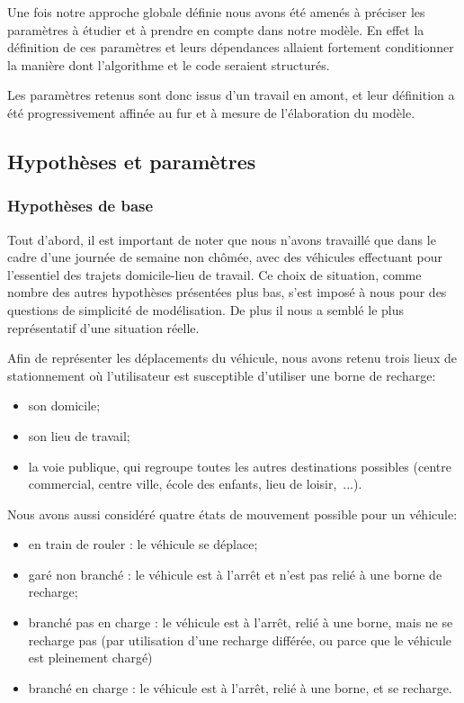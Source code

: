 		Une fois notre approche globale définie nous avons été amenés à préciser les paramètres à étudier et à prendre en compte dans notre modèle. En effet la définition de ces paramètres et leurs dépendances allaient fortement conditionner la manière dont l'algorithme et le code seraient structurés.

		Les paramètres retenus sont donc issus d'un travail en amont, et leur définition a été progressivement affinée au fur et à mesure de l'élaboration du modèle. 

	\subsection{Hypothèses et paramètres}
		\subsubsection{Hypothèses de base}
			Tout d'abord, il est important de noter que nous n'avons travaillé que dans le cadre d'une journée de semaine non chômée, avec des véhicules effectuant pour l'essentiel des trajets domicile-lieu de travail. Ce choix de situation, comme nombre des autres hypothèses présentées plus bas, s'est imposé à nous pour des questions de simplicité de modélisation. De plus il nous a semblé le plus représentatif d'une situation réelle.
			
			Afin de représenter les déplacements du véhicule, nous avons retenu trois lieux de stationnement où l'utilisateur est susceptible d'utiliser une borne de recharge:
			\begin{itemize}
				\item son domicile;
				\item son lieu de travail;
				\item la voie publique, qui regroupe toutes les autres destinations possibles (centre commercial, centre ville, école des enfants, lieu de loisir,~...).
			\end{itemize}
			
			Nous avons aussi considéré quatre états de mouvement possible pour un véhicule: 
			\begin{itemize}
				\item en train de rouler : le véhicule se déplace;
				\item garé non branché  : le véhicule est à l'arrêt et n'est pas relié à une borne de recharge;
				\item branché pas en charge : le véhicule est à l'arrêt, relié à une borne, mais ne se recharge pas (par utilisation d'une recharge différée, ou parce que le véhicule est pleinement chargé)
				\item branché en charge  : le véhicule est à l'arrêt, relié à une borne, et se recharge.
			\end{itemize}
		
